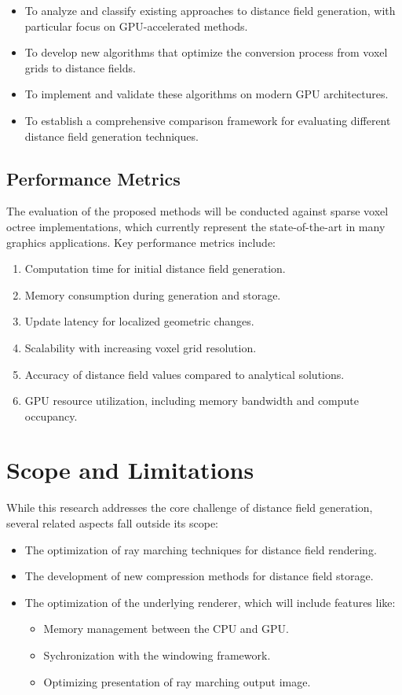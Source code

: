 \begin{itemize}
  \item To analyze and classify existing approaches to distance field generation, with particular focus on
  GPU-accelerated methods.
  \item To develop new algorithms that optimize the conversion process from voxel grids to distance fields.
  \item To implement and validate these algorithms on modern GPU architectures.
  \item To establish a comprehensive comparison framework for evaluating different distance field generation techniques.
\end{itemize}

\subsection{Performance Metrics}
The evaluation of the proposed methods will be conducted against sparse voxel octree implementations, which currently
represent the state-of-the-art in many graphics applications. Key performance metrics include:

\begin{enumerate}
  \item Computation time for initial distance field generation.
  \item Memory consumption during generation and storage.
  \item Update latency for localized geometric changes.
  \item Scalability with increasing voxel grid resolution.
  \item Accuracy of distance field values compared to analytical solutions.
  \item GPU resource utilization, including memory bandwidth and compute occupancy.
\end{enumerate}

\section{Scope and Limitations}
While this research addresses the core challenge of distance field generation, several related aspects fall outside its
scope:

\begin{itemize}
  \item The optimization of ray marching techniques for distance field rendering.
  \item The development of new compression methods for distance field storage.
  \item The optimization of the underlying renderer, which will include features like:
  
  \begin{itemize}
    \item Memory management between the CPU and GPU.\@
    \item Sychronization with the windowing framework.
    \item Optimizing presentation of ray marching output image.
  \end{itemize}
\end{itemize}

